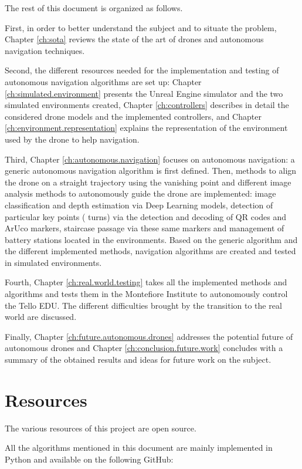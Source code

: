 The rest of this document is organized as follows.

First, in order to better understand the subject and to situate the problem, Chapter \ref{ch:sota} reviews the state of the art of drones and autonomous navigation techniques.

Second, the different resources needed for the implementation and testing of autonomous navigation algorithms are set up: Chapter \ref{ch:simulated.environment} presents the Unreal Engine simulator and the two simulated environments created, Chapter \ref{ch:controllers} describes in detail the considered drone models and the implemented controllers, and Chapter \ref{ch:environment.representation} explains the representation of the environment used by the drone to help navigation.

Third, Chapter \ref{ch:autonomous.navigation} focuses on autonomous navigation: a generic autonomous navigation algorithm is first defined. Then, methods to align the drone on a straight trajectory using the vanishing point and different image analysis methods to autonomously guide the drone are implemented: image classification and depth estimation via Deep Learning models, detection of particular key points (\eg{} turns) via the detection and decoding of QR codes and ArUco markers, staircase passage via these same markers and management of battery stations located in the environments. Based on the generic algorithm and the different implemented methods, navigation algorithms are created and tested in simulated environments.

Fourth, Chapter \ref{ch:real.world.testing} takes all the implemented methods and algorithms and tests them in the Montefiore Institute to autonomously control the Tello EDU. The different difficulties brought by the transition to the real world are discussed.

Finally, Chapter \ref{ch:future.autonomous.drones} addresses the potential future of autonomous drones and Chapter \ref{ch:conclusion.future.work} concludes with a summary of the obtained results and ideas for future work on the subject.

\section{Resources}\label{sec:01.resources}

The various resources of this project are open source.

All the algorithms mentioned in this document are mainly implemented in Python and available on the following GitHub:

